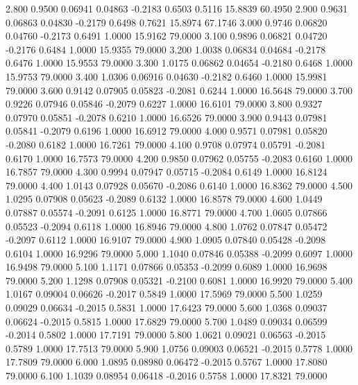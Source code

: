    2.800   0.9500   0.06941   0.04863  -0.2183   0.6503   0.5116  15.8839  60.4950
   2.900   0.9631   0.06863   0.04830  -0.2179   0.6498   0.7621  15.8974  67.1746
   3.000   0.9746   0.06820   0.04760  -0.2173   0.6491   1.0000  15.9162  79.0000
   3.100   0.9896   0.06821   0.04720  -0.2176   0.6484   1.0000  15.9355  79.0000
   3.200   1.0038   0.06834   0.04684  -0.2178   0.6476   1.0000  15.9553  79.0000
   3.300   1.0175   0.06862   0.04654  -0.2180   0.6468   1.0000  15.9753  79.0000
   3.400   1.0306   0.06916   0.04630  -0.2182   0.6460   1.0000  15.9981  79.0000
   3.600   0.9142   0.07905   0.05823  -0.2081   0.6244   1.0000  16.5648  79.0000
   3.700   0.9226   0.07946   0.05846  -0.2079   0.6227   1.0000  16.6101  79.0000
   3.800   0.9327   0.07970   0.05851  -0.2078   0.6210   1.0000  16.6526  79.0000
   3.900   0.9443   0.07981   0.05841  -0.2079   0.6196   1.0000  16.6912  79.0000
   4.000   0.9571   0.07981   0.05820  -0.2080   0.6182   1.0000  16.7261  79.0000
   4.100   0.9708   0.07974   0.05791  -0.2081   0.6170   1.0000  16.7573  79.0000
   4.200   0.9850   0.07962   0.05755  -0.2083   0.6160   1.0000  16.7857  79.0000
   4.300   0.9994   0.07947   0.05715  -0.2084   0.6149   1.0000  16.8124  79.0000
   4.400   1.0143   0.07928   0.05670  -0.2086   0.6140   1.0000  16.8362  79.0000
   4.500   1.0295   0.07908   0.05623  -0.2089   0.6132   1.0000  16.8578  79.0000
   4.600   1.0449   0.07887   0.05574  -0.2091   0.6125   1.0000  16.8771  79.0000
   4.700   1.0605   0.07866   0.05523  -0.2094   0.6118   1.0000  16.8946  79.0000
   4.800   1.0762   0.07847   0.05472  -0.2097   0.6112   1.0000  16.9107  79.0000
   4.900   1.0905   0.07840   0.05428  -0.2098   0.6104   1.0000  16.9296  79.0000
   5.000   1.1040   0.07846   0.05388  -0.2099   0.6097   1.0000  16.9498  79.0000
   5.100   1.1171   0.07866   0.05353  -0.2099   0.6089   1.0000  16.9698  79.0000
   5.200   1.1298   0.07908   0.05321  -0.2100   0.6081   1.0000  16.9920  79.0000
   5.400   1.0167   0.09004   0.06626  -0.2017   0.5849   1.0000  17.5969  79.0000
   5.500   1.0259   0.09029   0.06634  -0.2015   0.5831   1.0000  17.6423  79.0000
   5.600   1.0368   0.09037   0.06624  -0.2015   0.5815   1.0000  17.6829  79.0000
   5.700   1.0489   0.09034   0.06599  -0.2014   0.5802   1.0000  17.7191  79.0000
   5.800   1.0621   0.09021   0.06563  -0.2015   0.5789   1.0000  17.7513  79.0000
   5.900   1.0756   0.09003   0.06521  -0.2015   0.5778   1.0000  17.7809  79.0000
   6.000   1.0895   0.08980   0.06472  -0.2015   0.5767   1.0000  17.8080  79.0000
   6.100   1.1039   0.08954   0.06418  -0.2016   0.5758   1.0000  17.8321  79.0000
